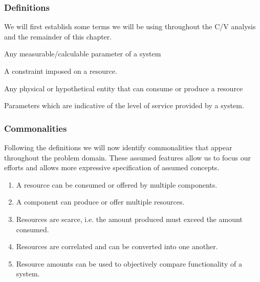 \subsubsection{Definitions}
We will first establish some terms we will be using throughout the C/V analysis and the remainder of this chapter. 
\begin{description}
\nospace
\item[Resource:] Any measurable/calculable parameter of a system
\item[Resource constraint:] A constraint imposed on a resource.
\item[Component:] Any physical or hypothetical entity that can consume or produce a resource
\item[Quality of Service (QoS):] Parameters which are indicative of the level of service provided by a system.
\end{description}
\subsubsection{Commonalities}
Following the definitions we will now identify commonalities that appear throughout the problem domain. These assumed features allow us to focus our efforts and allows more expressive specification of assumed concepts.
\begin{enumerate}[label=C\rdmid .\arabic*]
\nospace
\item \label{c:1resource_multiplex} A resource can be consumed or offered by multiple components.
\item \label{c:2component_multiplex} A component can produce or offer multiple resources.
\item \label{c:3scarce} Resources are scarce, i.e. the amount produced must exceed the amount consumed.
\item \label{c:4res_transf} Resources are correlated and can be converted into one another.
\item \label{c:5optimize} Resource amounts can be used to objectively compare functionality of a system.
\end{enumerate}

